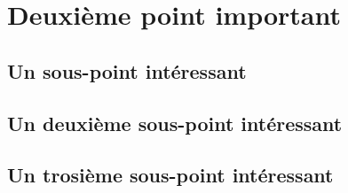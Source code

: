 \chapter{Deuxième point important}

\section{Un sous-point intéressant}

\section{Un deuxième sous-point intéressant}

\section{Un trosième sous-point intéressant}